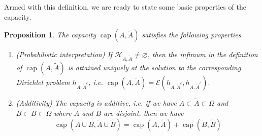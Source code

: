 \documentclass[english, aip, jcp, priprint, graphicx]{revtex4-1}
\newtheorem{proposition}{Proposition}
\theoremstyle{plain}
\theoremstyle{definition}
\theoremstyle{plain}
\begin{document}
Armed with this definition, we are ready to state some basic properties of the
capacity.

\begin{proposition}\label{prop:capacity}
The capacity $\ensuremath{\operatorname{cap}} (A, \tilde{A})$ satisfies the
following properties
\begin{enumerate}
\item (Probabilistic interpretation) If $\mathcal{H}_{A, \tilde{A}} \neq
\varnothing$, then the infimum in the definition of
$\ensuremath{\operatorname{cap}} (A, \tilde{A})$ is attained uniquely at
the solution to the corresponding Dirichlet problem $h_{A, \tilde{A}^c}$,
i.e. $\ensuremath{\operatorname{cap}} (A, \tilde{A}) = \mathcal{E} (h_{A,
\tilde{A}^c}, h_{A, \tilde{A}^c})$.

\item (Additivity) The capacity is additive, i.e. if we have $A \subset
\tilde{A} \subset \Omega$ and $B \subset \tilde{B} \subset \Omega$ where
$\tilde{A}$ and $\tilde{B}$ are disjoint, then we have
\[ \ensuremath{\operatorname{cap}} (A \cup B, \tilde{A} \cup \tilde{B})
=\ensuremath{\operatorname{cap}} (A, \tilde{A})
+\ensuremath{\operatorname{cap}} (B, \tilde{B}) \]
\end{enumerate}
\end{proposition}
\end{document}
